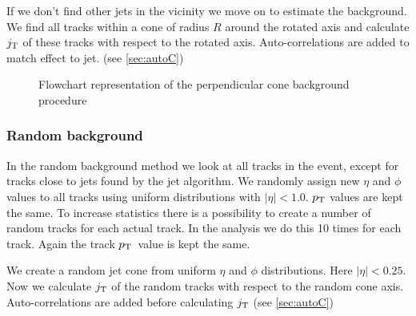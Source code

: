 If we don't find other jets in the vicinity we move on to estimate the background. We find all tracks within a cone of radius $R$ around the rotated axis and calculate $j_{\rm T}$ of these tracks with respect to the rotated axis. Auto-correlations are added to match effect to jet. (see \ref{sec:autoC})

\begin{figure}[htp]
\centering


\caption{Flowchart representation of the perpendicular cone background procedure}
\label{fig:bgflow}
\end{figure}




\subsubsection{Random background}
In the random background method we look at all tracks in the event, except for tracks close to jets found by the jet algorithm. We randomly assign new $\eta$ and $\phi$ values to all tracks using uniform distributions with $\left|\eta\right| < 1.0$. $p_{\rm T}$ values are kept the same. To increase statistics there is a possibility to create a number of random tracks for each actual track. In the analysis we do this 10 times for each track. Again the track $p_{\rm T}$ value is kept the same. 

We create a random jet cone from uniform $\eta$ and $\phi$ distributions. Here $\left| \eta \right| < 0.25$. Now we calculate $j_{\rm T}$ of the random tracks with respect to the random cone axis. Auto-correlations are added before calculating $j_{\rm T}$ (see \ref{sec:autoC})
